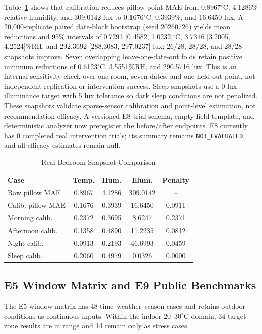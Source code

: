 \documentclass[conference,a4paper]{IEEEtran}
\begin{document}
Table~\ref{tab:real} shows that calibration reduces pillow-point MAE from 0.8967$^\circ$C, 4.1286\% relative humidity, and 309.0142 lux to 0.1676$^\circ$C, 0.3939\%, and 16.6450 lux. A 20,000-replicate paired date-block bootstrap (seed 20260726) yields mean reductions and 95\% intervals of 0.7291 [0.4582, 1.0232]$^\circ$C, 3.7346 [3.2005, 4.2524]\%RH, and 292.3692 [288.3083, 297.0237] lux; 26/28, 28/28, and 28/28 snapshots improve. Seven overlapping leave-one-date-out folds retain positive minimum reductions of 0.6123$^\circ$C, 3.5551\%RH, and 290.5716 lux. This is an internal sensitivity check over one room, seven dates, and one held-out point, not independent replication or intervention success. Sleep snapshots use a 0 lux illuminance target with 5 lux tolerance so dark sleep conditions are not penalized. These snapshots validate sparse-sensor calibration and point-level estimation, not recommendation efficacy. A versioned E8 trial schema, empty field template, and deterministic analyzer now preregister the before/after endpoints. E8 currently has 0 completed real intervention trials; its summary remains \texttt{NOT\_EVALUATED}, and all efficacy estimates remain null.

\begin{table}[t]
\caption{Real-Bedroom Snapshot Comparison}
\label{tab:real}
\centering
\scriptsize
\begin{tabular}{|l|c|c|c|c|}
\hline
Case & Temp. & Hum. & Illum. & Penalty\\
\hline
Raw pillow MAE & 0.8967 & 4.1286 & 309.0142 & --\\
Calib. pillow MAE & 0.1676 & 0.3939 & 16.6450 & 0.0911\\
Morning calib. & 0.2372 & 0.3695 & 8.6247 & 0.2371\\
Afternoon calib. & 0.1358 & 0.4890 & 11.2235 & 0.0812\\
Night calib. & 0.0913 & 0.2193 & 46.6993 & 0.0459\\
Sleep calib. & 0.2060 & 0.4979 & 0.0326 & 0.0000\\
\hline
\end{tabular}
\end{table}

\subsection{E5 Window Matrix and E9 Public Benchmarks}
The E5 window matrix has 48 time--weather--season cases and retains outdoor conditions as continuous inputs. Within the indoor $20$--$30^\circ$C domain, 34 target-zone results are in range and 14 remain only as stress cases.
\end{document}
